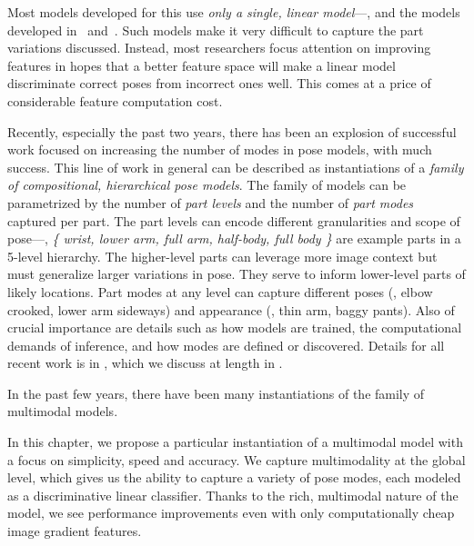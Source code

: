Most models developed for this use {\em only a single, linear model}---\eg, 
\citet{devacrf,eichner09,andriluka09,ddtran} and the models developed 
in~ and~.
Such models make it very difficult to capture the part variations discussed.  
Instead, most researchers focus attention on improving features in hopes that a 
better feature space will make a linear model discriminate correct poses from 
incorrect ones well.  This comes at a price of considerable feature computation 
cost.  

Recently, especially the past two years, there has been an explosion of  successful work 
focused on increasing the number of modes in pose models, with much success.  
This line of work in general can be described as instantiations of a {\em 
family of compositional, hierarchical pose models}.  The family of models can 
be parametrized by the number of {\em part levels } and the number of {\em part 
modes} captured per part.  The part levels can encode different granularities 
and scope of pose---\eg, {\em \{ wrist, lower arm, full arm, half-body, full 
body \}} are example parts in a 5-level hierarchy.  The higher-level parts can 
leverage more image context but must generalize larger variations in pose.  
They serve to inform lower-level parts of likely locations.  Part modes at any 
level can capture different poses (\eg, elbow crooked, lower arm sideways) and 
appearance (\eg, thin arm, baggy pants).  Also of crucial importance are 
details such as how models are trained, the computational demands of inference, 
and how modes are defined or discovered.  Details for all recent work is in 
, which we discuss at length in .


 \begin{table}[tb]
\begin{center}
{\tiny

}
\caption[Family of multimodal pose models.]{In the past few years, there have 
been many instantiations of the family of multimodal models. }
\label{tab:rel-work-ps} \end{center}
\end{table}

 In this chapter, we propose a particular instantiation of 
a multimodal model with a focus on simplicity, speed and accuracy.  We capture 
multimodality at the global level, which gives us the ability to capture a 
variety of pose modes, each modeled as a discriminative linear classifier.  
Thanks to the rich, multimodal nature of the model, we see performance 
improvements even with only computationally cheap image gradient features.  

